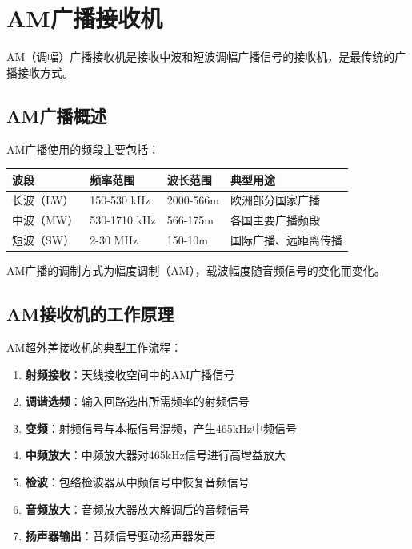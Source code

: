 \section{AM广播接收机}
\label{sec:am_broadcast_receiver}

AM（调幅）广播接收机是接收中波和短波调幅广播信号的接收机，是最传统的广播接收方式。

\subsection{AM广播概述}
\label{sec:am_broadcast_intro}

AM广播使用的频段主要包括：

\begin{center}
\begin{tabular}{|p{2cm}|p{3cm}|p{4cm}|p{3cm}|}
\hline
\textbf{波段} & \textbf{频率范围} & \textbf{波长范围} & \textbf{典型用途} \\
\hline
长波（LW） & 150-530 kHz & 2000-566m & 欧洲部分国家广播 \\
中波（MW） & 530-1710 kHz & 566-175m & 各国主要广播频段 \\
短波（SW） & 2-30 MHz & 150-10m & 国际广播、远距离传播 \\
\hline
\end{tabular}
\end{center}

AM广播的调制方式为幅度调制（AM），载波幅度随音频信号的变化而变化。

\subsection{AM接收机的工作原理}
\label{sec:am_receiver_principle}

AM超外差接收机的典型工作流程：

\begin{enumerate}
    \item \textbf{射频接收}：天线接收空间中的AM广播信号
    \item \textbf{调谐选频}：输入回路选出所需频率的射频信号
    \item \textbf{变频}：射频信号与本振信号混频，产生465kHz中频信号
    \item \textbf{中频放大}：中频放大器对465kHz信号进行高增益放大
    \item \textbf{检波}：包络检波器从中频信号中恢复音频信号
    \item \textbf{音频放大}：音频放大器放大解调后的音频信号
    \item \textbf{扬声器输出}：音频信号驱动扬声器发声
\end{enumerate}

